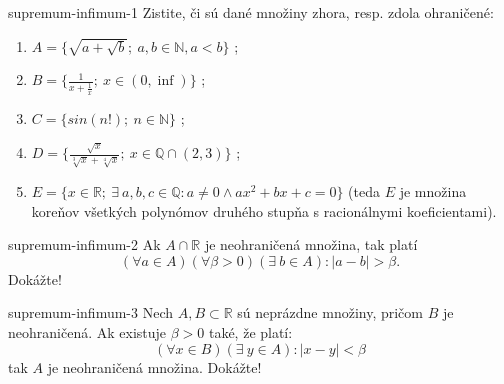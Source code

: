 \begin{defproblem}{supremum-infimum-1}
Zistite, či sú dané množiny zhora, resp. zdola ohraničené:
\begin{enumerate}
  \item $A = \{ \sqrt{a + \sqrt{b}} ; \: a, b \in \mathbb{N}, a < b \}$ ;
  \item $B = \{ \frac{1}{x + \frac{1}{x}} ; \: x \in (0, \inf) \}$ ;
  \item $C = \{ sin(n!) ; \: n \in \mathbb{N} \}$ ;
  \item $D = \{ \frac{\sqrt{x}}{\sqrt[3]{x} + \sqrt[4]{x}}; \:
              x \in \mathbb{Q} \cap (2, 3) \}$ ;
  \item $E = \{ x \in \mathbb{R}; \: \exists \: a, b, c \in \mathbb{Q}:
                a \neq 0 \land ax^2 + bx +c = 0 \}$
        (teda $E$ je množina koreňov všetkých polynómov druhého stupňa s
        racionálnymi koeficientami).
\end{enumerate}
\end{defproblem}

\begin{defproblem}{supremum-infimum-2}
Ak $A \cap \mathbb{R}$ je neohraničená množina, tak platí
$$
(\forall a \in A) (\forall \beta > 0) (\exists \: b \in A): |a - b| > \beta .
$$
Dokážte!
\end{defproblem}

\begin{defproblem}{supremum-infimum-3}
Nech $A, B \subset \mathbb{R}$ sú neprázdne množiny, pričom $B$ je
neohraničená. Ak existuje $\beta > 0$ také, že platí:
$$
(\forall x \in B) (\exists \: y \in A): |x - y| < \beta
$$
tak $A$ je neohraničená množina. Dokážte!
\end{defproblem}

